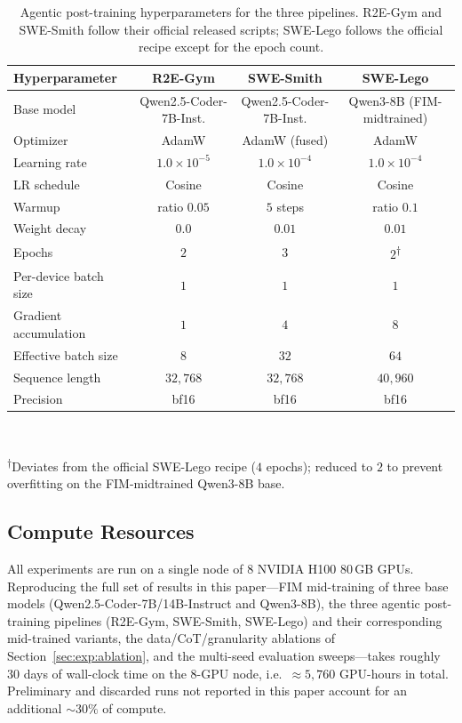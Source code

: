\begin{table}[h]
\centering
\footnotesize
\caption{Agentic post-training hyperparameters for the three pipelines.
R2E-Gym and SWE-Smith follow their official released scripts; SWE-Lego
follows the official recipe except for the epoch count.}
\label{tab:hp-posttrain}
\setlength{\tabcolsep}{6pt}
\begin{tabular}{lccc}
\toprule
\textbf{Hyperparameter} & \textbf{R2E-Gym} & \textbf{SWE-Smith} & \textbf{SWE-Lego} \\
\midrule
Base model            & Qwen2.5-Coder-7B-Inst.
                      & Qwen2.5-Coder-7B-Inst.
                      & Qwen3-8B (FIM-midtrained) \\
Optimizer             & AdamW & AdamW (fused) & AdamW \\
Learning rate         & $1.0\!\times\!10^{-5}$
                      & $1.0\!\times\!10^{-4}$
                      & $1.0\!\times\!10^{-4}$ \\
LR schedule           & Cosine & Cosine & Cosine \\
Warmup                & ratio $0.05$ & $5$ steps & ratio $0.1$ \\
Weight decay          & $0.0$ & $0.01$ & $0.01$ \\
Epochs                & $2$ & $3$ & $2$\textsuperscript{$\dagger$} \\
Per-device batch size & $1$ & $1$ & $1$ \\
Gradient accumulation & $1$ & $4$ & $8$ \\
Effective batch size  & $8$ & $32$ & $64$ \\
Sequence length       & $32{,}768$ & $32{,}768$ & $40{,}960$ \\
Precision             & bf16 & bf16 & bf16 \\
\bottomrule
\end{tabular}
\\[0.3em]
{\raggedright \footnotesize \textsuperscript{$\dagger$}Deviates from the
official SWE-Lego recipe ($4$ epochs); reduced to $2$ to prevent
overfitting on the FIM-midtrained Qwen3-8B base.\par}
\end{table}

\subsection{Compute Resources}
\label{app:hp:compute}
All experiments are run on a single node of $8$ NVIDIA H100 80\,GB GPUs.
Reproducing the full set of results in this paper---FIM mid-training
of three base models (Qwen2.5-Coder-7B/14B-Instruct and Qwen3-8B), the
three agentic post-training pipelines (R2E-Gym, SWE-Smith, SWE-Lego)
and their corresponding mid-trained variants, the data/CoT/granularity
ablations of Section~\ref{sec:exp:ablation}, and the multi-seed evaluation
sweeps---takes roughly $30$ days of wall-clock time on the $8$-GPU node,
i.e.\ $\approx\!5{,}760$ GPU-hours in total. Preliminary and discarded
runs not reported in this paper account for an additional ${\sim}30\%$
of compute.

